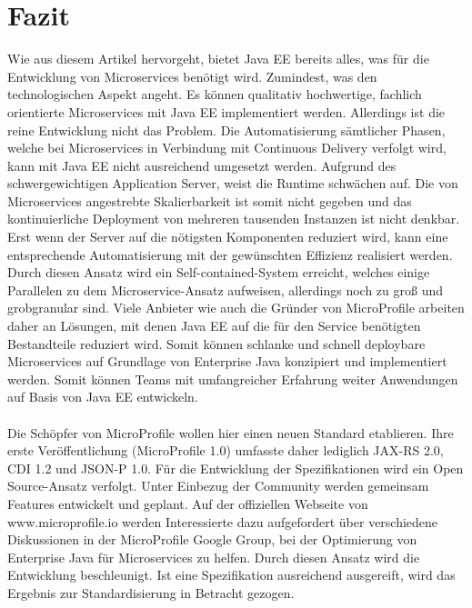 \section{Fazit}
Wie aus diesem Artikel hervorgeht, bietet Java EE bereits alles, was für die Entwicklung von Microservices benötigt wird. Zumindest, was den technologischen Aspekt angeht. Es können qualitativ hochwertige, fachlich orientierte Microservices mit Java EE implementiert werden. Allerdings ist die reine Entwicklung nicht das Problem. Die Automatisierung sämtlicher Phasen, welche bei Microservices in Verbindung mit Continuous Delivery verfolgt wird, kann mit Java EE nicht ausreichend umgesetzt werden. Aufgrund des schwergewichtigen Application Server, weist die Runtime schwächen auf. Die von Microservices angestrebte Skalierbarkeit ist somit nicht gegeben und das kontinuierliche Deployment von mehreren tausenden Instanzen ist nicht denkbar. Erst wenn der Server auf die nötigsten Komponenten reduziert wird, kann eine entsprechende Automatisierung mit der gewünschten Effizienz realisiert werden. Durch diesen Ansatz wird ein Self-contained-System erreicht, welches einige Parallelen zu dem Microservice-Ansatz aufweisen, allerdings noch zu groß und grobgranular sind. Viele Anbieter wie auch die Gründer von MicroProfile arbeiten daher an Lösungen, mit denen Java EE auf die für den Service benötigten Bestandteile reduziert wird. Somit können schlanke und schnell deploybare Microservices auf Grundlage von Enterprise Java konzipiert und implementiert werden. Somit können Teams mit umfangreicher Erfahrung weiter Anwendungen auf Basis von Java EE entwickeln. \\ \\
Die Schöpfer von MicroProfile wollen hier einen neuen Standard etablieren. Ihre erste Veröffentlichung (MicroProfile 1.0) umfasste daher lediglich JAX-RS 2.0, CDI 1.2 und JSON-P 1.0. Für die Entwicklung der Spezifikationen wird ein Open Source-Ansatz verfolgt. Unter Einbezug der Community werden gemeinsam Features entwickelt und geplant. Auf der offiziellen Webseite von www.microprofile.io werden Interessierte dazu aufgefordert über verschiedene Diskussionen in der MicroProfile Google Group, bei der Optimierung von Enterprise Java für Microservices zu helfen. Durch diesen Ansatz wird die Entwicklung beschleunigt. Ist eine Spezifikation ausreichend ausgereift, wird das Ergebnis zur Standardisierung in Betracht gezogen. 

